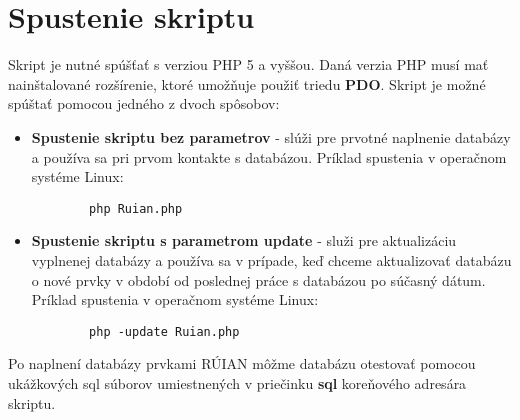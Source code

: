 \section {Spustenie skriptu}
Skript je nutné spúšťať s verziou PHP 5 a vyššou. Daná verzia PHP musí mať nainštalované rozšírenie, ktoré umožňuje použiť triedu {\bf PDO}. Skript je možné spúštať pomocou jedného z dvoch spôsobov: 
\begin{itemize}
    \item {{\bf Spustenie skriptu bez parametrov} - slúži pre prvotné naplnenie databázy a používa sa pri prvom kontakte s databázou. Príklad spustenia v operačnom systéme Linux: 
    \begin{verbatim}
        php Ruian.php
    \end{verbatim}
    }
    \item{{\bf Spustenie skriptu s parametrom update} - služi pre aktualizáciu vyplnenej databázy a používa sa v prípade, keď chceme aktualizovať databázu o nové prvky v období od poslednej práce s databázou po súčasný dátum. Príklad spustenia v operačnom systéme Linux:
     \begin{verbatim}
        php -update Ruian.php
    \end{verbatim}}
\end{itemize}
Po naplnení databázy prvkami RÚIAN môžme databázu otestovať pomocou ukážkových sql súborov umiestnených v priečinku {\bf sql} koreňového adresára skriptu.



